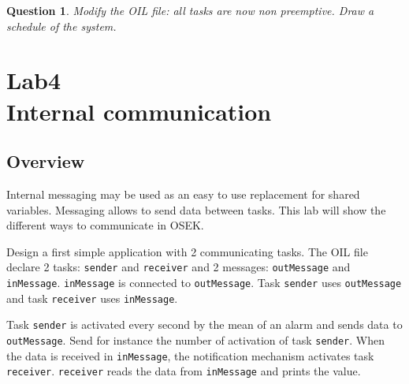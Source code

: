 \documentclass[11pt]{report}
\newtheorem{ex}{Question}
\begin{document}
\begin{ex}
Modify the OIL file: all tasks are now non preemptive. Draw a schedule of the system.
\end{ex}


%

\chapter{Lab4\\Internal communication}

\section{Overview}

Internal messaging may be used as an easy to use replacement for shared variables. Messaging allows to send data between tasks. This lab will show the different ways to communicate in OSEK.

Design a first simple application with 2 communicating tasks.
The OIL file declare 2 tasks: \texttt{sender} and \texttt{receiver} and 2 messages: \texttt{outMessage} and \texttt{inMessage}. \texttt{inMessage} is connected to \texttt{outMessage}. Task \texttt{sender} uses \texttt{outMessage} and task \texttt{receiver} uses \texttt{inMessage}.

Task \texttt{sender} is activated every second by the mean of an alarm and sends data to \texttt{outMessage}.
Send for instance the number of activation of task \texttt{sender}.
When the data is received in \texttt{inMessage}, the notification mechanism activates task \texttt{receiver}.
\texttt{receiver} reads the data from \texttt{inMessage} and prints the value.
\end{document}
